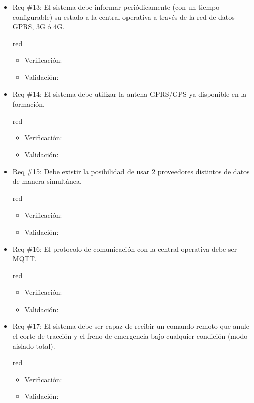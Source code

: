 \documentclass[11pt]{charter}
\begin{document}
\begin{itemize}
\item Req \#13: El sistema debe informar periódicamente (con un tiempo configurable) su estado a la central operativa a través de la red de datos GPRS, 3G ó 4G.
\begin{consigna}{red}
\begin{itemize}
  \item Verificación:\\
  \item Validación:\\
\end{itemize}
\end{consigna}

\item Req \#14: El sistema debe utilizar la antena GPRS/GPS ya disponible en la formación.
\begin{consigna}{red}
\begin{itemize}
  \item Verificación:\\
  \item Validación:\\
\end{itemize}
\end{consigna}

\item Req \#15: Debe existir la posibilidad de usar 2 proveedores distintos de datos de manera simultánea.
\begin{consigna}{red}
\begin{itemize}
  \item Verificación:\\
  \item Validación:\\
\end{itemize}
\end{consigna}

\item Req \#16: El protocolo de comunicación con la central operativa debe ser MQTT.
\begin{consigna}{red}
\begin{itemize}
  \item Verificación:\\
  \item Validación:\\
\end{itemize}
\end{consigna}

\item Req \#17: El sistema debe ser capaz de recibir un comando remoto que anule el corte de tracción y el freno de emergencia bajo cualquier condición (modo aislado total).
\begin{consigna}{red}
\begin{itemize}
  \item Verificación:\\
  \item Validación:\\
\end{itemize}
\end{consigna}


\end{itemize}
\end{document}
